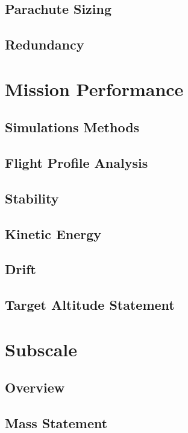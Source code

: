     \subsection{Parachute Sizing}
    

    \subsection{Redundancy}
    

\section{Mission Performance}

    \subsection{Simulations Methods}
    

    \subsection{Flight Profile Analysis}
    

    \subsection{Stability}
    

    \subsection{Kinetic Energy}
    

    \subsection{Drift}
    

    \subsection{Target Altitude Statement}


\section{Subscale}

    \subsection{Overview}
    

    \subsection{Mass Statement}
    

